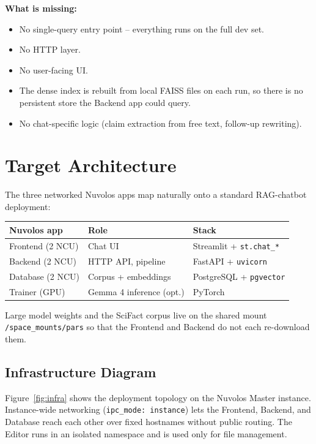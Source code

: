 \documentclass[11pt,a4paper]{article}
\begin{document}
\textbf{What is missing:}
\begin{itemize}
  \item No single-query entry point -- everything runs on the full dev set.
  \item No HTTP layer.
  \item No user-facing UI.
  \item The dense index is rebuilt from local FAISS files on each run, so
        there is no persistent store the Backend app could query.
  \item No chat-specific logic (claim extraction from free text,
        follow-up rewriting).
\end{itemize}

\section{Target Architecture}

The three networked Nuvolos apps map naturally onto a standard
RAG-chatbot deployment:

\begin{center}
\begin{tabular}{@{}lll@{}}
\toprule
\textbf{Nuvolos app} & \textbf{Role} & \textbf{Stack} \\
\midrule
Frontend (2 NCU) & Chat UI          & Streamlit + \texttt{st.chat\_*} \\
Backend  (2 NCU) & HTTP API, pipeline & FastAPI + \texttt{uvicorn} \\
Database (2 NCU) & Corpus + embeddings & PostgreSQL + \texttt{pgvector} \\
Trainer (GPU)   & Gemma 4 inference (opt.) & PyTorch \\
\bottomrule
\end{tabular}
\end{center}

Large model weights and the SciFact corpus live on the shared mount
\texttt{/space\_mounts/pars} so that the Frontend and Backend do not each
re-download them.

\subsection{Infrastructure Diagram}

Figure~\ref{fig:infra} shows the deployment topology on the Nuvolos
Master instance. Instance-wide networking (\texttt{ipc\_mode: instance})
lets the Frontend, Backend, and Database reach each other over fixed
hostnames without public routing. The Editor runs in an isolated
namespace and is used only for file management.
\end{document}

